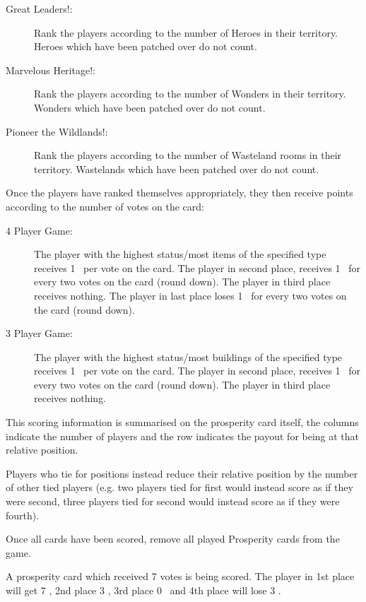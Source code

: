 \documentclass[10pt,twocolumn]{article}
\begin{document}
{\begin{description}
\item[Great Leaders!:] Rank the players according to the number of Heroes in their territory. Heroes which have been patched over do not count.
\item[Marvelous Heritage!:] Rank the players according to the number of Wonders in their territory. Wonders which have been patched over do not count.
\item[Pioneer the Wildlands!:] Rank the players according to the number of Wasteland rooms in their territory. Wastelands which have been patched over do not count.
\end{description}
}
Once the players have ranked themselves appropriately, they then receive points according to the number of votes on the card:

\begin{description}
\item[4 Player Game:] The player with the highest status/most items of the specified type receives 1 \vp\ per vote on the card. The player in second place, receives 1 \vp\ for every two votes on the card (round down). The player in third place receives nothing. The player in last place loses 1 \vp\ for every two votes on the card (round down).

\item[3 Player Game:] The player with the highest status/most buildings of the specified type receives 1 \vp\ per vote on the card. The player in second place, receives 1 \vp\ for every two votes on the card (round down). The player in third place receives nothing.
\end{description}

This scoring information is summarised on the prosperity card itself, the columns indicate the number of players and the row indicates the payout for being at that relative position.

Players who tie for positions instead reduce their relative position by the number of other tied players (e.g. two players tied for first would instead score as if they were second, three players tied for second would instead score as if they were fourth).

Once all cards have been scored, remove all played Prosperity cards from the game.

\begin{BoxExample}A prosperity card which received 7 votes is being scored. The player in 1st place will get 7 \vps, 2nd place 3 \vps, 3rd place 0 \vps\ and 4th place will lose 3 \vps.\end{BoxExample}
\end{document}
